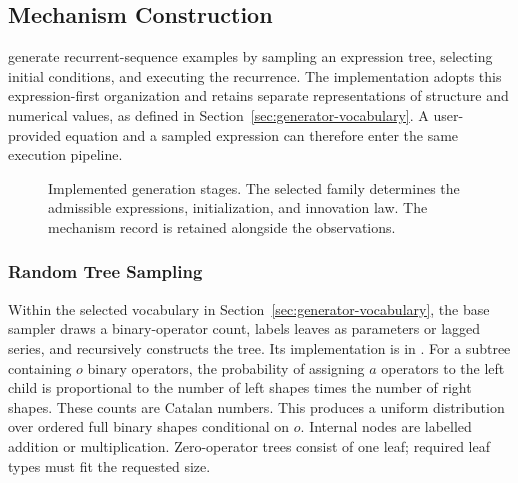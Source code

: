\subsection{Mechanism Construction}
\label{sec:generator-expression-pipeline}

\citet[Section~2.1]{dascoli2022deep} generate recurrent-sequence examples by
sampling an expression tree, selecting initial conditions, and executing the
recurrence. The implementation adopts this expression-first organization and
retains separate representations of structure and numerical values, as
defined in Section~\ref{sec:generator-vocabulary}. A user-provided equation
and a sampled expression can therefore enter the same execution pipeline.

\begin{figure}[H]
\centering
{}
\caption{Implemented generation stages. The selected family determines the
admissible expressions, initialization, and innovation law. The mechanism
record is retained alongside the observations.}
\label{fig:implemented-generator-pipeline}
\end{figure}

\subsubsection{Random Tree Sampling}
Within the selected vocabulary in Section~\ref{sec:generator-vocabulary},
the base sampler draws a binary-operator count, labels leaves as parameters
or lagged series, and recursively constructs the tree. Its implementation
is in .
For a subtree containing $o$ binary operators, the
probability of assigning $a$ operators to the left child is proportional to
the number of left shapes times the number of right shapes. These counts
are Catalan numbers. This produces a uniform distribution over ordered full
binary shapes conditional on $o$. Internal nodes
are labelled addition or multiplication. Zero-operator trees consist of one
leaf; required leaf types must fit the requested size.

